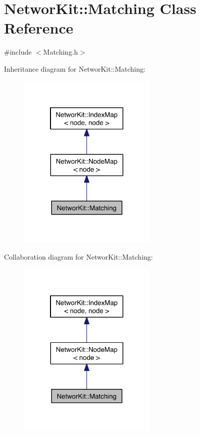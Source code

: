 \hypertarget{class_networ_kit_1_1_matching}{\section{Networ\-Kit\-:\-:Matching Class Reference}
\label{class_networ_kit_1_1_matching}
}


{\ttfamily \#include $<$Matching.\-h$>$}



Inheritance diagram for Networ\-Kit\-:\-:Matching\-:\nopagebreak
\begin{figure}[H]
\begin{center}
\leavevmode
\includegraphics[width=188pt]{class_networ_kit_1_1_matching__inherit__graph}
\end{center}
\end{figure}


Collaboration diagram for Networ\-Kit\-:\-:Matching\-:\nopagebreak
\begin{figure}[H]
\begin{center}
\leavevmode
\includegraphics[width=188pt]{class_networ_kit_1_1_matching__coll__graph}
\end{center}
\end{figure}
